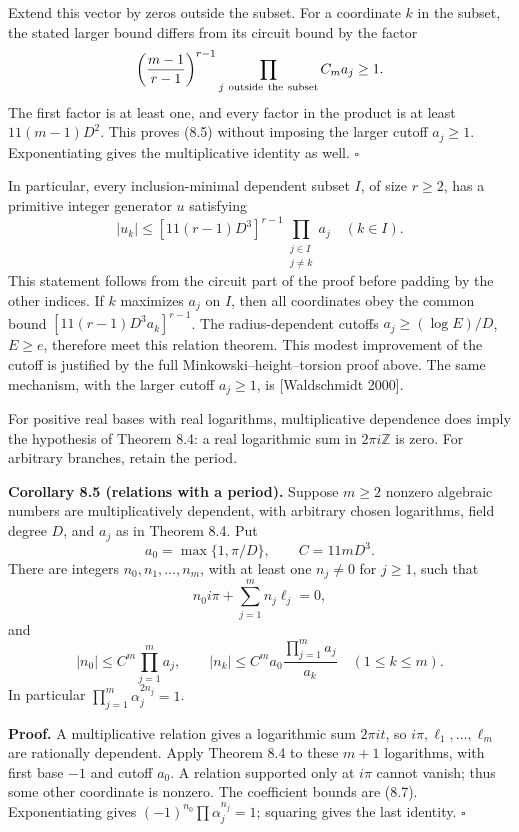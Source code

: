 \documentclass[
  11pt,
  a4paper,
]{article}
\begin{document}
Extend this vector by zeros outside the subset. For a coordinate \(k\)
in the subset, the stated larger bound differs from its circuit bound by
the factor \[
\left(\frac{m-1}{r-1}\right)^{r-1}
\prod_{j\ {\rm outside\ the\ subset}} C_ma_j\ge1.
\] The first factor is at least one, and every factor in the product is
at least \(11(m-1)D^2\). This proves (8.5) without imposing the larger
cutoff \(a_j\ge1\). Exponentiating gives the multiplicative identity as
well. \(\square\)

In particular, every inclusion-minimal dependent subset \(I\), of size
\(r\ge2\), has a primitive integer generator \(u\) satisfying \[
|u_k|\le[11(r-1)D^3]^{r-1}
\prod_{\substack{j\in I\\j\ne k}}a_j\quad(k\in I).
\tag{8.6}
\] This statement follows from the circuit part of the proof before
padding by the other indices. If \(k\) maximizes \(a_j\) on \(I\), then
all coordinates obey the common bound \([11(r-1)D^3a_k]^{r-1}\). The
radius-dependent cutoffs \(a_j\ge(\log E)/D\), \(E\ge e\), therefore
meet this relation theorem. This modest improvement of the cutoff is
justified by the full Minkowski--height--torsion proof above. The same
mechanism, with the larger cutoff \(a_j\ge1\), is {[}Waldschmidt
2000{]}.

For positive real bases with real logarithms, multiplicative dependence
does imply the hypothesis of Theorem 8.4: a real logarithmic sum in
\(2\pi i\mathbb Z\) is zero. For arbitrary branches, retain the period.

\textbf{Corollary 8.5 (relations with a period).} Suppose \(m\ge2\)
nonzero algebraic numbers are multiplicatively dependent, with arbitrary
chosen logarithms, field degree \(D\), and \(a_j\) as in Theorem 8.4.
Put \[
a_0=\max\{1,\pi/D\},\qquad C=11mD^3.
\] There are integers \(n_0,n_1,\ldots,n_m\), with at least one
\(n_j\ne0\) for \(j\ge1\), such that \[
n_0i\pi+\sum_{j=1}^mn_j\ell_j=0,
\] and \[
|n_0|\le C^m\prod_{j=1}^ma_j,\qquad
|n_k|\le C^ma_0\frac{\prod_{j=1}^ma_j}{a_k}\quad(1\le k\le m).
\tag{8.7}
\] In particular \(\prod_{j=1}^m\alpha_j^{2n_j}=1\).

\textbf{Proof.} A multiplicative relation gives a logarithmic sum
\(2\pi it\), so \(i\pi,\ell_1,\ldots,\ell_m\) are rationally dependent.
Apply Theorem 8.4 to these \(m+1\) logarithms, with first base \(-1\)
and cutoff \(a_0\). A relation supported only at \(i\pi\) cannot vanish;
thus some other coordinate is nonzero. The coefficient bounds are (8.7).
Exponentiating gives \((-1)^{n_0}\prod\alpha_j^{n_j}=1\); squaring gives
the last identity. \(\square\)
\end{document}
